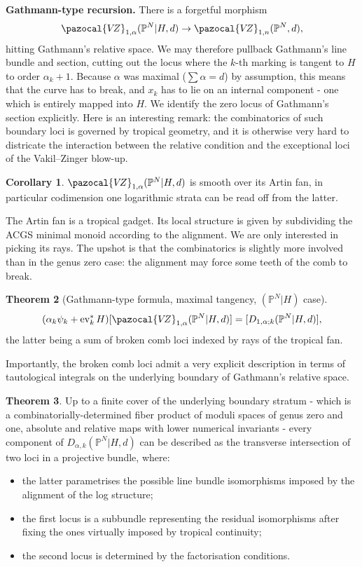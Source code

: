 \documentclass[11pt]{amsart}
\newcommand{\PP}{\mathbb P}
\newcommand{\VZ}{\pazocal{V\!Z}}
\renewcommand{\to}{\rightarrow}
\newcommand{\ev}{\operatorname{ev}}
\theoremstyle{definition}
\newtheorem{thm}{Theorem}[section]
\newtheorem{cor}[thm]{Corollary}
\theoremstyle{definition}
\begin{document}
\textbf{Gathmann-type recursion.} There is a forgetful morphism \[\VZ_{1,\alpha}(\PP^N|H,d)\to \VZ_{1,n}(\PP^N,d),\] hitting Gathmann's relative space. We may therefore pullback Gathmann's line bundle and section, cutting out the locus where the $k$-th marking is tangent to $H$ to order $\alpha_k+1$. Because $\alpha$ was maximal ($\sum\alpha=d$) by assumption, this means that the curve has to break, and $x_k$ has to lie on an internal component - one which is entirely mapped into $H$. We identify the zero locus of Gathmann's section explicitly. Here is an interesting remark: the combinatorics of such boundary loci is governed by tropical geometry, and it is otherwise very hard to districate the interaction between the relative condition and the exceptional loci of the Vakil--Zinger blow-up.
\begin{cor}
 $\VZ_{1,\alpha}(\PP^N|H,d)$ is smooth over its Artin fan, in particular codimension one logarithmic strata can be read off from the latter.
\end{cor}
The Artin fan is a tropical gadget. Its local structure is given by subdividing the ACGS minimal monoid according to the alignment. We are only interested in picking its rays. The upshot is that the combinatorics is slightly more involved than in the genus zero case: the alignment may force some teeth of the comb to break.
\begin{thm}[Gathmann-type formula, maximal tangency, $(\PP^N|H)$ case]
 \[(\alpha_k\psi_k+\ev_k^*H)[\VZ_{1,\alpha}(\PP^N|H,d)]=[D_{1,\alpha;k}(\PP^N|H,d)],\]
 the latter being a sum of broken comb loci indexed by rays of the tropical fan.
\end{thm}
Importantly, the broken comb loci admit a very explicit description in terms of tautological integrals on the underlying boundary of Gathmann's relative space.
\begin{thm}
 Up to a finite cover of the underlying boundary stratum - which is a combinatorially-determined fiber product of moduli spaces of genus zero and one, absolute and relative maps with lower numerical invariants - every component of $D_{\alpha,k}(\PP^N|H,d)$ can be described as the transverse intersection of two loci in a projective bundle, where:
 \begin{itemize}
  \item the latter parametrises the possible line bundle isomorphisms imposed by the alignment of the log structure;
  \item the first locus is a subbundle representing the residual isomorphisms after fixing the ones virtually imposed by tropical continuity;
  \item the second locus is determined by the factorisation conditions.
 \end{itemize}
\end{thm}
\end{document}

